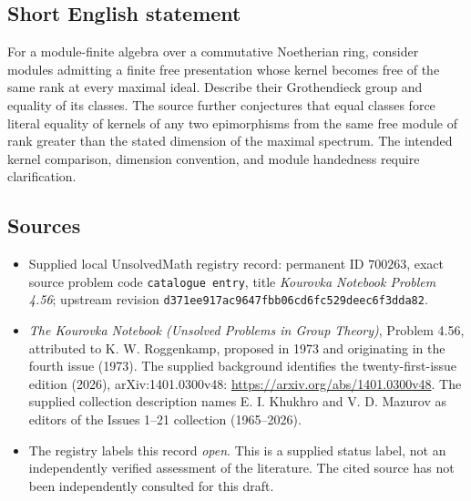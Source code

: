 \documentclass[11pt]{article}
\begin{document}
\subsection{Short English statement}
For a module-finite algebra over a commutative Noetherian ring, consider modules admitting a finite free presentation whose kernel becomes free of the same rank at every maximal ideal. Describe their Grothendieck group and equality of its classes. The source further conjectures that equal classes force literal equality of kernels of any two epimorphisms from the same free module of rank greater than the stated dimension of the maximal spectrum. The intended kernel comparison, dimension convention, and module handedness require clarification.
\subsection{Sources}
\begin{itemize}
\item Supplied local UnsolvedMath registry record: permanent ID \(700263\), exact source problem code \texttt{catalogue entry}, title \emph{Kourovka Notebook Problem 4.56}; upstream revision \texttt{d371ee917ac9647fbb06cd6fc529deec6f3dda82}.
\item \emph{The Kourovka Notebook (Unsolved Problems in Group Theory)}, Problem 4.56, attributed to K. W. Roggenkamp, proposed in 1973 and originating in the fourth issue (1973). The supplied background identifies the twenty-first-issue edition (2026), arXiv:1401.0300v48: \url{https://arxiv.org/abs/1401.0300v48}. The supplied collection description names E. I. Khukhro and V. D. Mazurov as editors of the Issues 1--21 collection (1965--2026).
\item The registry labels this record \emph{open}. This is a supplied status label, not an independently verified assessment of the literature. The cited source has not been independently consulted for this draft.
\end{itemize}
\end{document}
